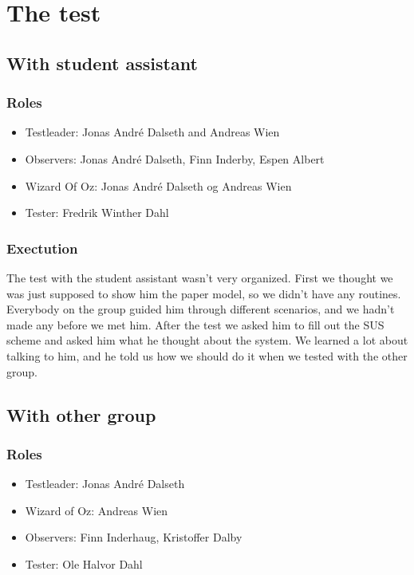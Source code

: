 \documentclass{article}
\begin{document}
\section{The test}
\subsection{With student assistant}
\subsubsection*{Roles}
\begin{itemize}
\item Testleader: Jonas André Dalseth and Andreas Wien
\item Observers: Jonas André Dalseth, Finn Inderby, Espen Albert
\item Wizard Of Oz: Jonas André Dalseth og Andreas Wien
\item Tester: Fredrik Winther Dahl
\end{itemize}

\subsubsection*{Exectution}
The test with the student assistant wasn't very organized. First we thought we was just supposed to show him the paper model, so we didn't have any routines. Everybody on the group guided him through different scenarios, and we hadn't made any before we met him. After the test we asked him to fill out the SUS scheme and asked him what he thought about the system. We learned a lot about talking to him, and he told us how we should do it when we tested with the other group. 


\subsection{With other group}
\subsubsection*{Roles}
\begin{itemize}
\item Testleader: Jonas André Dalseth
\item Wizard of Oz: Andreas Wien
\item Observers: Finn Inderhaug, Kristoffer Dalby
\item Tester: Ole Halvor Dahl
\end{itemize}
\end{document}

